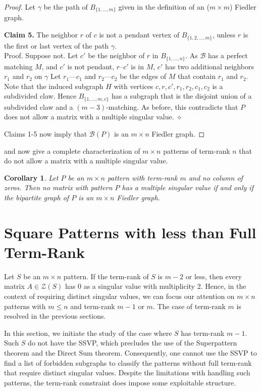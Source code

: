 \documentclass[preprint,12pt]{elsarticle}
\newcommand{\Z}{\mathcal{Z}}
\newtheorem{corollary}[theorem]{Corollary}
\begin{document}
\begin{proof}
\bigskip\noindent
Let $\gamma$ be the path of $B_{\{1,\ldots, m\}}$
given in the definition of an ($m\times m$) Fiedler graph.


\bigskip\noindent
{\bf Claim 5.}  The neighbor $r$  of $c$ is not a pendant vertex
of $B_{\{1,2,\ldots, m\}}$, unless $r$ is the 
first or last vertex of the path $\gamma$. 
\\ [12pt]
Proof. 
Suppose not. Let $c'$ be the neighbor of $r$ in $B_{\{1,\ldots, n\}}$.  As $\mathcal{B}$ has a perfect matching $M$,
and $c'$ is not pendant,  $r$--$c'$ is in $M$, $c'$ has two additional neighbors $r_1$ and $r_2$ on $\gamma$  Let $r_1$---$c_1$ and $r_2$---$c_2$ be the edges of $M$ that contain $r_1$ and $r_2$.
Note that  the induced subgraph $H$ with vertices $c,r,c',r_1,r_2,c_1,c_2$
is a subdivided claw. Hence $B_{\{1,\ldots, m,c\}}$
has a subgraph that is the disjoint union of a subdivided claw 
and a $(m-3)$-matching.  As before, this contradicts that $P$ does not
allow a matrix with a multiple singular value. \hfill $\diamond$ 



\bigskip\noindent
Claims 1-5 now imply that $\mathcal{B}(P)$ is an $m\times n$ Fiedler graph.
\end{proof}


 and  now give a complete characterization of $m\times n$ patterns of term-rank $n$ that do not 
allow a matrix with a multiple singular value. 
\begin{corollary}
  Let $P$ be an $m\times n$ pattern with term-rank $m$ and no column of zeros. 
  Then no matrix with pattern $P$ has a multiple singular value if and only if the bipartite graph of $P$ is an $m\times n$ Fiedler graph.  
\end{corollary}
\section{Square Patterns with less than Full Term-Rank}

Let $S$ be an $m \times n$ pattern. If the term-rank of $S$ is $m-2$ or less, then every matrix $A\in \Z(S)$ has $0$ as a singular value with multiplicity 2. Hence, in the context of requiring distinct singular values, we can focus our attention on $m\times n$ patterns with $m\leq n$ and  term-rank $m-1$ or $m$.  The case of term-rank $m$ is resolved in the previous sections. 

In this section, we initiate the study of the case where 
$S$ has term-rank $m-1$.  
Such $S$ do not have the SSVP, which precludes the use of the Superpattern theorem and the Direct Sum theorem.  Consequently, one cannot use the SSVP to find a list of forbidden subgraphs to classify the patterns without full term-rank that require distinct singular values.  Despite the limitations with handling such patterns, the term-rank constraint does impose some exploitable structure.
\end{document}
